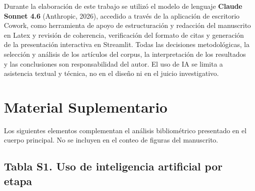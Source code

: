 \documentclass[12pt, a4paper]{article}
\begin{document}
Durante la elaboración de este trabajo se utilizó el modelo de lenguaje \textbf{Claude Sonnet 4.6} (Anthropic, 2026), accedido a través de la aplicación de escritorio Cowork, como herramienta de apoyo de estructuración y redacción del manuscrito en Latex y revisión de coherencia, verificación del formato de citas y generación de la presentación interactiva en Streamlit. Todas las decisiones metodológicas, la selección y análisis de los artículos del corpus, la interpretación de los resultados y las conclusiones son responsabilidad del autor. El uso de IA se limita a asistencia textual y técnica, no en el diseño ni en el juicio investigativo.

\FloatBarrier


\section*{Material Suplementario}

Los siguientes elementos complementan el análisis bibliométrico presentado en el cuerpo principal. No se incluyen en el conteo de figuras del manuscrito.

\subsection*{Tabla S1. Uso de inteligencia artificial por etapa}
\end{document}

